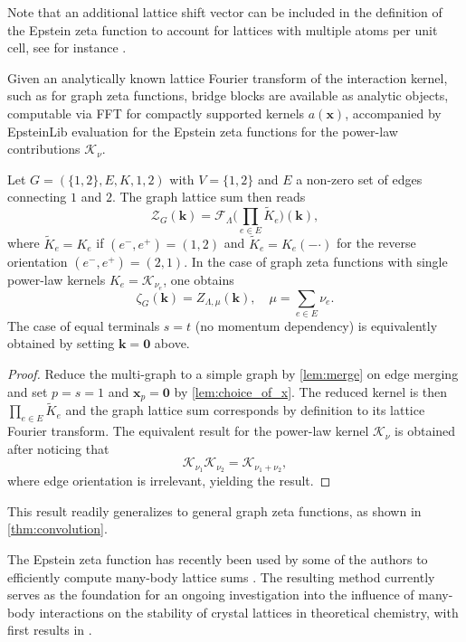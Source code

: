 \documentclass[]{amsart}
\numberwithin{mythm}{section}
\begin{document}
Note that an additional lattice shift vector can be included in the definition of the Epstein zeta function to account for lattices with multiple atoms per unit cell, see for instance \cite{buchheit2024epstein}. 

Given an analytically known lattice Fourier transform of the interaction kernel, such as for graph zeta functions, bridge blocks are available as analytic objects, computable via FFT for compactly supported kernels $a(\bm x)$, accompanied by EpsteinLib evaluation for the Epstein zeta functions for the power-law contributions $\mathcal K_\nu$.
\begin{lemma}
    \label{lem:bridge}
    Let $G=(\{1,2\},E,K,1,2)$ with $V=\{1,2\}$ and $E$ a non-zero set of edges connecting $1$ and $2$. The graph lattice sum then reads
    \[
    \mathcal Z_G(\bm k) = \mathcal F_{\Lambda} \bigg(\prod_{e\in E} \tilde K_e\bigg)(\bm k),
    \]
    where $\tilde K_e=K_e$ if $(e^-,e^+)=(1,2)$ and $\tilde K_e=K_e(-\bm \cdot)$ for the reverse orientation $(e^-,e^+)=(2,1)$. 
    In the case of graph zeta functions with single power-law kernels $K_e=\mathcal K_{\nu_e}$, one obtains
    \[
    \mathcal \zeta_G(\bm k)=Z_{\Lambda,\mu}(\bm k), \quad \mu=\sum_{e\in E}\nu_e.
    \]
    The case of equal terminals $s=t$ (no momentum dependency) is equivalently obtained by setting $\bm k=\bm 0$ above.
\end{lemma}
\begin{proof}
    Reduce the multi-graph to a simple graph by \cref{lem:merge} on edge merging and set $p=s=1$ and $\bm x_p=\bm 0$ by \cref{lem:choice_of_x}. The reduced kernel is then $\prod_{e\in E} \tilde K_e$ and the graph lattice sum corresponds by definition to its lattice Fourier transform. The equivalent result for the power-law kernel $\mathcal K_{\nu}$ is obtained after noticing that
    \[
    \mathcal K_{\nu_1}\mathcal K_{\nu_2} = \mathcal K_{\nu_1+\nu_2},
    \]
    where edge orientation is irrelevant, yielding the result.
\end{proof}
This result readily generalizes to general graph zeta functions, as shown in \ref{thm:convolution}.

The Epstein zeta function has recently been used by some of the authors to efficiently compute many-body lattice sums   \cite{buchheit2025epstein_method}. The resulting method currently serves as the foundation for an ongoing investigation into the influence of many-body interactions on the stability of crystal lattices in theoretical chemistry, with first results in \cite{robles2025exact}. 
\end{document}
